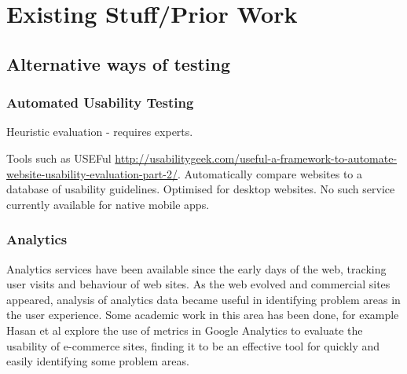 \chapter{Existing Stuff/Prior Work}

\section{Alternative ways of testing}

\subsection{Automated Usability Testing}

Heuristic evaluation - requires experts.


Tools such as USEFul \cite{dingli2011useful} \url{http://usabilitygeek.com/useful-a-framework-to-automate-website-usability-evaluation-part-2/}. Automatically compare websites to a database of usability guidelines. Optimised for desktop websites. No such service currently available for native mobile apps.

\subsection{Analytics}

Analytics services have been available since the early days of the web, tracking user visits and behaviour of web sites. As the web evolved and commercial sites appeared, analysis of analytics data became useful in identifying problem areas in the user experience. Some academic work in this area has been done, for example Hasan et al \cite{hasan2009using} explore the use of metrics in Google Analytics to evaluate the usability of e-commerce sites, finding it to be an effective tool for quickly and easily identifying some problem areas.

